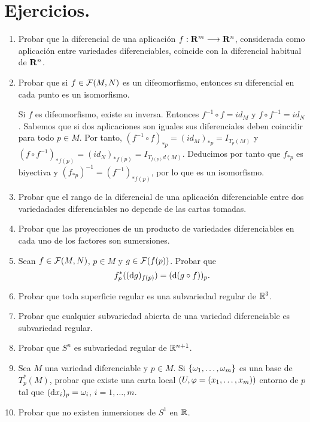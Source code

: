 \documentclass[Cursovd_portada.tex]{subfiles}
\begin{document}
\section{Ejercicios.}
\begin{enumerate}
\item Probar que la diferencial de una aplicación $f:{\bf R}^m
\longrightarrow {\bf R}^n$, considerada como aplicación entre
variedades diferenciables, coincide con la diferencial habitual de
${\bf R}^n$.

\item Probar que si $f\in{\cal F}(M,N)$ es un
difeomorfismo, entonces su diferencial en cada punto es un
isomorfismo. 

Si $f$ es difeomorfismo, existe su inversa. Entonces $f^{-1} \circ f = id_M$ y $f \circ f^{-1} = id_N$. Sabemos que si dos aplicaciones son iguales sus diferenciales deben coincidir para todo $p \in M$. Por tanto, $(f^{-1}\circ f)_{\ast p} = (id_M)_{\ast p} = I_{T_p(M)}$ y  $(f\circ f^{-1})_{\ast f(p)} = (id_N)_{\ast f(p)} = I_{T_{f(p)}d(M)}$. Deducimos por tanto que $f_{\ast p}$ es biyectiva y $(f_{\ast p})^{-1} = (f^{-1})_{\ast f(p)}$, por lo que es un isomorfismo.

\item Probar que el rango de la diferencial de una aplicación diferenciable entre dos variedadades diferenciables
no depende de las cartas tomadas. \item Probar que las
proyecciones de un producto de variedades diferenciables en cada
uno de los factores son sumersiones. \item Sean
$f\in{\cal F}(M,N)$, $p\in M$ y $g\in{\cal F}(f(p))$. Probar que
$$f_p^*(({\rm d} g)_{f(p)})=({\rm d} (g\circ f))_p.$$

\item Probar que toda superficie regular es una subvariedad regular de $\mathbb{R}^3$.

\item Probar que cualquier subvariedad abierta de una variedad
diferenciable es subvariedad regular.

\item Probar que $S^n$ es subvariedad regular de $\mathbb{R}^{n+1}$.

\item Sea $M$ una variedad diferenciable y $p\in M$. Si
$\{\omega_1,\dots ,\omega_m\}$ es una base de $T_p^*(M)$, probar que
existe una carta local $(U,\varphi=(x_1,\dots ,x_m))$ entorno de $p$
tal que $({\rm d} x_i)_p=\omega_i$, $i=1,\dots ,m$. \item Probar que
no existen inmersiones de $S^1$ en $\mathbb{R}$.


\end{enumerate}
\end{document}
